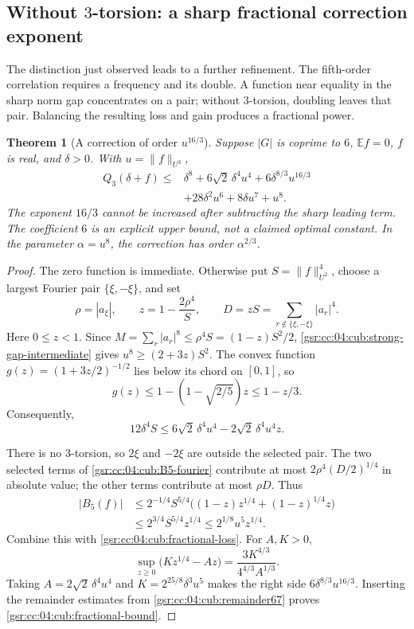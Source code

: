 \documentclass[11pt,letterpaper]{article}
\numberwithin{equation}{section}
\newtheorem{theorem}{Theorem}[section]
\theoremstyle{definition}
\theoremstyle{remark}
\newcommand{\1}{\mathbf 1}
\begin{document}
\subsection{Without \texorpdfstring{$3$}{3}-torsion: a sharp fractional correction exponent}

The distinction just observed leads to a further refinement. The fifth-order
correlation requires a frequency and its double. A function near equality
in the sharp norm gap concentrates on a pair; without $3$-torsion, doubling
leaves that pair. Balancing the resulting loss and gain produces a fractional
power.

\begin{theorem}[A correction of order $u^{16/3}$]
\label{gsr:cc:04:cub:fractional}
Suppose $|G|$ is coprime to $6$, $\mathbb E f=0$, $f$ is real, and
$\delta>0$. With $u=\|f\|_{U^3}$,
\begin{align}
 Q_3(\delta+f)\leq{}&\delta^8+6\sqrt2\,\delta^4u^4
                        +6\delta^{8/3}u^{16/3}\nonumber\\
                      &+28\delta^2u^6+8\delta u^7+u^8.
 \label{gsr:cc:04:cub:fractional-bound}
\end{align}
The exponent $16/3$ cannot be increased after subtracting the sharp leading
term. The coefficient $6$ is an explicit upper bound, not a claimed optimal
constant. In the parameter $\alpha=u^8$, the correction has order
$\alpha^{2/3}$.
\end{theorem}

\begin{proof}
The zero function is immediate. Otherwise put $S=\|f\|_{U^2}^4$, choose
a largest Fourier pair $\{\xi,-\xi\}$, and set
\[
 \rho=|a_\xi|,\qquad z=1-\frac{2\rho^4}{S},\qquad
 D=zS=\sum_{r\notin\{\xi,-\xi\}}|a_r|^4.
\]
Here $0\leq z<1$. Since
$M=\sum_r|a_r|^8\leq\rho^4S=(1-z)S^2/2$,
\eqref{gsr:cc:04:cub:strong-gap-intermediate} gives $u^8\geq(2+3z)S^2$.
The convex function $g(z)=(1+3z/2)^{-1/2}$ lies below its chord on $[0,1]$,
so
\[
 g(z)\leq1-(1-\sqrt{2/5})z\leq1-z/3.
\]
Consequently,
\begin{equation}
 12\delta^4S\leq6\sqrt2\,\delta^4u^4
                          -2\sqrt2\,\delta^4u^4z.
 \label{gsr:cc:04:cub:fractional-loss}
\end{equation}

There is no $3$-torsion, so $2\xi$ and $-2\xi$ are outside the selected
pair. The two selected terms of \eqref{gsr:cc:04:cub:B5-fourier} contribute at most
$2\rho^4(D/2)^{1/4}$ in absolute value; the other terms contribute at most
$\rho D$. Thus
\begin{align*}
 |B_5(f)|
 &\leq2^{-1/4}S^{5/4}
       \bigl((1-z)z^{1/4}+(1-z)^{1/4}z\bigr)\\
 &\leq2^{3/4}S^{5/4}z^{1/4}
 \leq2^{1/8}u^5z^{1/4}.
\end{align*}
Combine this with \eqref{gsr:cc:04:cub:fractional-loss}. For $A,K>0$,
\[
 \sup_{z\geq0}\bigl(Kz^{1/4}-Az\bigr)
       =\frac{3K^{4/3}}{4^{4/3}A^{1/3}}.
\]
Taking $A=2\sqrt2\,\delta^4u^4$ and $K=2^{25/8}\delta^3u^5$ makes the
right side $6\delta^{8/3}u^{16/3}$. Inserting the remainder estimates from
\eqref{gsr:cc:04:cub:remainder67} proves \eqref{gsr:cc:04:cub:fractional-bound}.
\end{proof}
\end{document}

